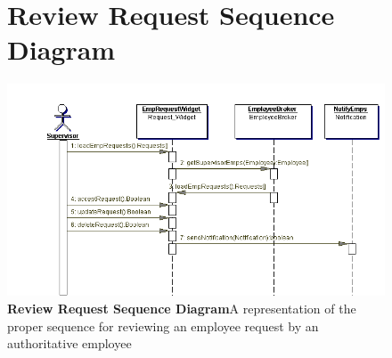 \documentclass[letterpaper,12pt]{report}
\begin{document}
\begin{figure}[hbp]
 \section{Review Request Sequence Diagram}
 \includegraphics[scale=0.85]{externals/ReviewEmployeeRequestSequence.png}
 \caption{\small
\textbf{Review Request Sequence Diagram}\newline A representation of the proper sequence for reviewing an employee request by an authoritative employee}\label{fig:seqMaintEmp}
\end{figure}
\newpage
\end{document}
